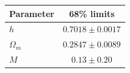 \begin{tabular} { l  c}

 Parameter &  68\% limits\\
\hline
{\boldmath$h              $} & $0.7018\pm 0.0017          $\\

{\boldmath$Ω_m            $} & $0.2847\pm 0.0089          $\\

{\boldmath$M              $} & $0.13\pm 0.20              $\\
\hline
\end{tabular}